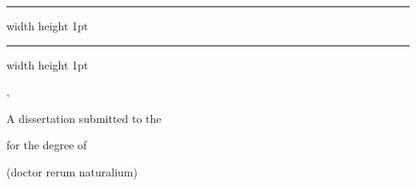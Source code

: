 \begin{titlepage}

	\centering
	    {%
	    	\color{myorange}
	    	\hrule width \hsize height 1pt \kern 22pt 
	    	\color{black}
	    	\huge{
	    		\Title
	    	\par}
	    	\color{myorange}
	    	\kern 22pt \hrule width \hsize height 1pt 
	    }%
	    
	    
	    \vspace*{100pt}
	
	    {%
	      	\LARGE
	      	\Author, \AuthorDegree\par
		
	      	\vspace*{14pt}  
	    }
	    {\normalsize
	      	\SubmissionDate\par
	    }
	    
	    \vspace*{140pt}
		{\Large
			{\normalsize
				A dissertation submitted to the\par
			}
			\Institute\par
			\University\par
		}
		\vspace*{80pt} 
		{\Large
			{\normalsize
				for the degree of\par	
			}
			\Degree\par
			\vspace*{4pt}
			{\normalsize
				(doctor rerum naturalium)\par
			}
		}

	
\end{titlepage}

%
%

